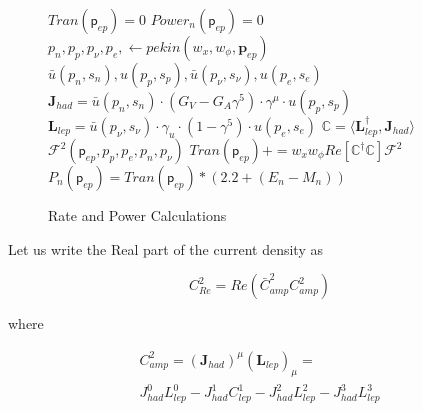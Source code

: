 \documentclass[%
 aip,
 jmp,%
 amsmath,amssymb,
 reprint,%
]{revtex4-1}
\begin{document}
 \begin{figure}
 \begin{minipage}{\linewidth}
\begin{algorithm}[H]
\caption{Rate and Power Calculations}\label{code}
\begin{algorithmic}[1]
\State $Tran(\mathsf{p}_{ep})=0$
\State $Power_{n}(\mathsf{p}_{ep})=0$
\State $p_{n},p_{p}, p_{\nu},p_{e}, \gets pekin(w_{x},w_{\phi},\mathbf{p}_{ep})$
\State $\bar{u}(p_{n},s_{n}),u(p_{p},s_{p}), \bar{u}(p_{\nu},s_{\nu}), u(p_{e},s_{e})$
\State $\mathbf{J}_{had}=\bar{u}(p_{n},s_{n})\cdot(G_{V}-G_{A}\gamma^{5})\cdot\gamma^{\mu}\cdot u(p_{p},s_{p})$
\State $\mathbf{L}_{lep}=\bar{u}(p_{\nu},s_{\nu})\cdot\gamma_{u}\cdot(1-\gamma^{5})\cdot u(p_{e},s_{e})$
\EndFor
\State $\mathbb{C}=\langle\mathbf{L}^{\dagger}_{lep},\mathbf{J}_{had}\rangle$
\EndFor
\EndFor
\State $\mathcal{F}^{2}(\mathsf{p}_{ep},p_{p},p_{e}, p_{n}, p_{\nu})$
\State $Tran(\mathsf{p}_{ep})+=w_{x}w_{\phi}Re[\mathbb{C}^{\dagger}\mathbb{C}]\mathcal{F}^{2}$
\EndFor
\State $P_{n}(\mathsf{p}_{ep})=Tran(\mathsf{p}_{ep})*(2.2+(E_{n}-M_{n}))$
\EndFor
\end{algorithmic}
\end{algorithm}
\end{minipage}
\end{figure}


Let us write the Real part of the current density as

$$C^{2}_{Re}=Re(\bar{C}^{2}_{amp}{C}^{2}_{amp})$$

where

\begin{multline}
C^{2}_{amp}=(\mathbf{J}_{had})^{\mu}(\mathbf{L}_{lep})_{\mu}=\\
J^{0}_{had}L^{0}_{lep}-J^{1}_{had}C^{1}_{lep}-J^{2}_{had}L^{2}_{lep}-J^{3}_{had}L^{3}_{lep}
\end{multline}
\end{document}
